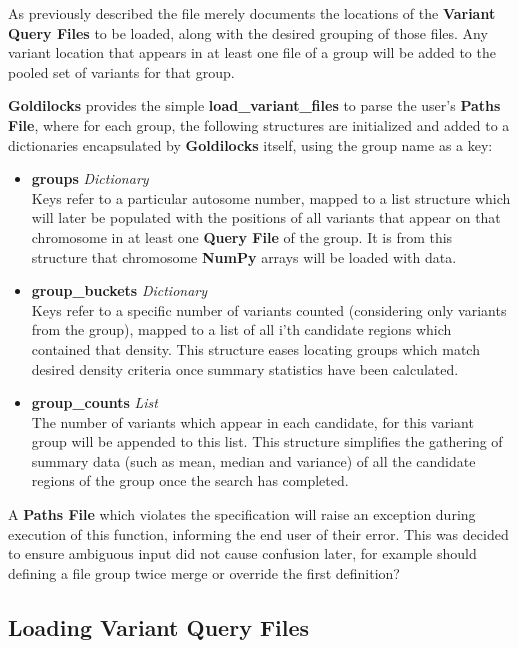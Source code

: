 As previously described the file merely documents the locations of the
\textbf{Variant Query Files} to be loaded, along with the desired grouping of
those files. Any variant location that appears in at least one file of a group
will be added to the pooled set of variants for that group.

\textbf{Goldilocks} provides the simple \textbf{load\_variant\_files} to parse
the user's \textbf{Paths File}, where for each group, the following structures are
initialized and added to a dictionaries encapsulated by \textbf{Goldilocks}
itself, using the group name as a key:

\begin{itemize}
    \item \textbf{groups} \textit{Dictionary}\hfill\\
        Keys refer to a particular autosome number, mapped to a list structure
        which will later be populated with the positions of all variants that
        appear on that chromosome in at least one \textbf{Query File} of
        the group. It is from this structure that chromosome \textbf{NumPy}
        arrays will be loaded with data.
    \item \textbf{group\_buckets} \textit{Dictionary}\hfill\\
        Keys refer to a specific number of variants counted (considering only
        variants from the group), mapped to a list
        of all i'th candidate regions which contained that density.
        This structure eases locating groups which match desired density
        criteria once summary statistics have been calculated.
    \item \textbf{group\_counts} \textit{List}\hfill\\
        The number of variants which appear in each candidate, for this variant
        group will be appended to this list.  This structure simplifies the
        gathering of summary data (such as mean, median and variance) of all the
        candidate regions of the group once the search has completed.
\end{itemize}

A \textbf{Paths File} which violates the specification will raise an exception
during execution of this function, informing the end user of their error. This
was decided to ensure ambiguous input did not cause confusion later, for example
should defining a file group twice merge or override the first
definition?


\subsection{Loading Variant Query Files}
%
%

